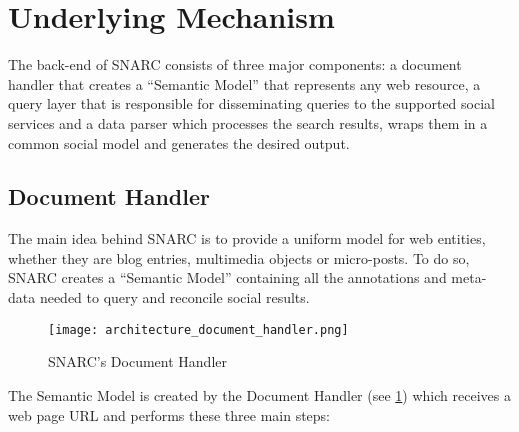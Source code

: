 
\section{Underlying Mechanism}
The back-end of SNARC consists of three major components: a document handler that creates a ``Semantic Model'' that represents any web resource, a query layer that is responsible for disseminating queries to the supported social services and a data parser which processes the search results, wraps them in a common social model and generates the desired output.

\subsection{Document Handler}
The main idea behind SNARC is to provide a uniform model for web entities, whether they are blog entries, multimedia objects or micro-posts. To do so, SNARC creates a ``Semantic Model'' containing all the annotations and meta-data needed to query and reconcile social results.

\begin{figure}[!ht]
  \centering
    \texttt{[image: architecture\_document\_handler.png]}
  \caption{SNARC's Document Handler}
  \label{fig:architecture_document_handler}
\end{figure}

The Semantic Model is created by the Document Handler (see \ref{fig:architecture_document_handler}) which receives a web page URL and performs these three main steps:

